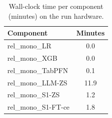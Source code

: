 \begin{table}[!t]
\caption{Wall-clock time per component (minutes) on the run hardware.}
\label{tab:compute}
\centering
\footnotesize
\begin{tabular}{lc}
\hline
Component & Minutes \\ \hline
rel\_mono\_LR & 0.0 \\
rel\_mono\_XGB & 0.0 \\
rel\_mono\_TabPFN & 0.1 \\
rel\_mono\_LLM-ZS & 11.9 \\
rel\_mono\_S1-ZS & 1.2 \\
rel\_mono\_S1-FT-ce & 1.8 \\
\hline
\end{tabular}
\end{table}